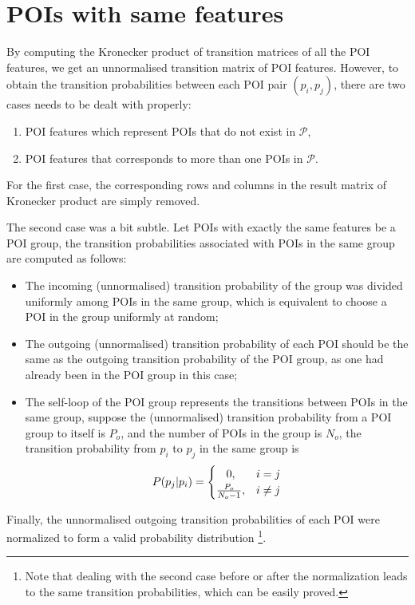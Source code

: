 
\section{POIs with same features}


By computing the Kronecker product of transition matrices of all the POI features,
we get an unnormalised transition matrix of POI features.
However, to obtain the transition probabilities between each POI pair $(p_i, p_j)$,
there are two cases needs to be dealt with properly:
\begin{enumerate}
\item POI features which represent POIs that do not exist in $\mathcal{P}$,
\item POI features that corresponds to more than one POIs in $\mathcal{P}$.
\end{enumerate}

For the first case,
the corresponding rows and columns in the result matrix of Kronecker product are simply removed.

The second case was a bit subtle.
Let POIs with exactly the same features be a POI group,
the transition probabilities associated with POIs in the same group are computed as follows:
\begin{itemize}
\item The incoming (unnormalised) transition probability of the group was divided uniformly among POIs
      in the same group, which is equivalent to choose a POI in the group uniformly at random;
\item The outgoing (unnormalised) transition probability of each POI should be the same as the
      outgoing transition probability of the POI group, as one had already been in the POI group in this case;
\item The self-loop of the POI group represents the transitions between POIs in the same group,
      suppose the (unnormalised) transition probability from a POI group to itself is $P_o$,
      and the number of POIs in the group is $N_o$,
      the transition probability from $p_i$ to $p_j$ in the same group is
      \begin{displaymath}
          P(p_j | p_i) =
          \begin{cases}
              \hfill 0, \hfill & i = j \\
              \hfill \frac{P_o}{N_o - 1}, \hfill & i \ne j \\
          \end{cases}
      \end{displaymath}
\end{itemize}
Finally, the unnormalised outgoing transition probabilities of each POI were normalized to form
a valid probability distribution
\footnote{Note that dealing with the second case before or after the normalization leads to
the same transition probabilities, which can be easily proved. }.


